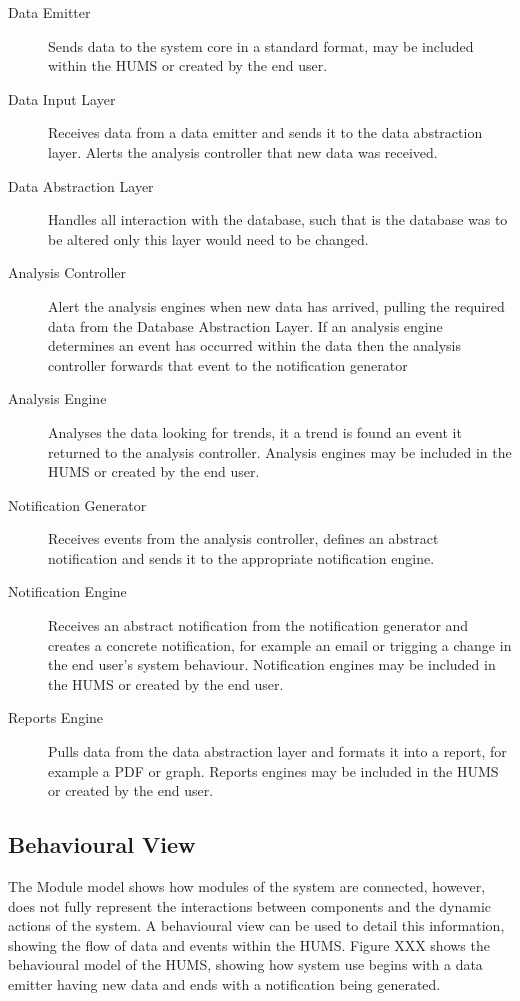 \documentclass[10pt,a4paper]{article}
\begin{document}
\begin{description}
\item[Data Emitter]  Sends data to the system core in a standard format, may be included within the HUMS or created by the end user.
\item[Data Input Layer] Receives data from a data emitter and sends it to the data abstraction layer. Alerts the analysis controller that new data was received.
\item[Data Abstraction Layer] Handles all interaction with the database, such that is the database was to be altered only this layer would need to be changed.
\item[Analysis Controller] Alert the analysis engines when new data has arrived, pulling the required data from the Database Abstraction Layer. If an analysis engine determines an event has occurred within the data then the analysis controller forwards that event to the notification generator
 \item[Analysis Engine] Analyses the data looking for trends, it a trend is found an event it returned to the analysis controller. Analysis engines may be included in the HUMS or created by the end user.
 \item[Notification Generator] Receives events from the analysis controller, defines an abstract notification and sends it to the appropriate notification engine.
 \item[Notification Engine] Receives an abstract notification from the notification generator and creates a concrete notification, for example an email or trigging a change in the end user's system behaviour. Notification engines may be included in the HUMS or created by the end user.
  \item[Reports Engine] Pulls data from the data abstraction layer and formats it into a report, for example a PDF or graph. Reports engines may be included in the HUMS or created by the end user.
\end{description}

\subsection{Behavioural View}
The Module model shows how modules of the system are connected, however, does not fully represent the interactions between components and the dynamic actions of the system.
A behavioural view can be used to detail this information, showing the flow of data and events within the HUMS. Figure XXX shows the behavioural model of the HUMS, showing how system use begins with a data emitter having new data and ends with a notification being generated.
\end{document}
